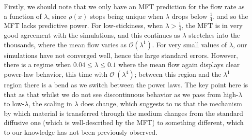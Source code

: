 \documentclass[
reprint,
 amsmath,amssymb,
 aps,
 prl,
]{revtex4-1}
\begin{document}
Firstly, we should note that we only have an MFT prediction for the flow rate as a function of $\lambda$, since $\rho(x)$ stops being unique when $\lambda$ drops below $\frac{1}{4}$,
and so the MFT lacks predictive power. For low-stickiness, when $\lambda>\frac{1}{4}$, the MFT is in very good agreement with the simulations, and this continues as $\lambda$ stretches into the thousands, where
the mean flow varies as $\mathcal{O}(\lambda^1)$.
For very small values of $\lambda$, our simulations have not converged well, hence the large standard errors. However, there is a regime when $0.04 \le \lambda \le 0.1$ where the mean flow again displays clear power-law behavior, this time with
$\mathcal{O}~(\lambda^{4})$; between this region and the $\lambda^1$ region there is a bend as we switch between the power laws.
The key point here is that as that whilst we do not see discontinuous behavior as we pass from high-$\lambda$ to low-$\lambda$, the scaling in $\lambda$ does change,
which suggests to us that the mechanism by which material is transferred through the medium changes
from the standard diffusive one (which is well-described by the MFT) to something different, which to our knowledge has not been previously observed.
\end{document}

